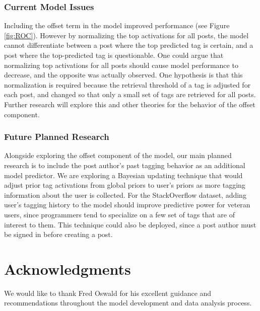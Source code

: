 \documentclass[10pt,letterpaper]{article}
\begin{document}
\subsubsection{Current Model Issues}

Including the offset term in the model improved performance (see Figure \ref{fig:ROC}).
However by normalizing the top activations for all posts, the model cannot differentiate between a post where the top predicted tag is certain, and a post where the top-predicted tag is questionable.
One could argue that normalizing top activations for all posts should cause model performance to decrease, and the opposite was actually observed.
One hypothesis is that this normalization is required because the retrieval threshold of a tag is adjusted for each post, and changed so that only a small set of tags are retrieved for all posts.
Further research will explore this and other theories for the behavior of the offset component.

\subsubsection{Future Planned Research}

Alongside exploring the offset component of the model, our main planned research is to include the post author's past tagging behavior as an additional model predictor.
We are exploring a Bayesian updating technique that would adjust prior tag activations from global priors to user's priors as more tagging information about the user is collected.
For the StackOverflow dataset, adding user's tagging history to the model should improve predictive power for veteran users,
since programmers tend to specialize on a few set of tags that are of interest to them.
This technique could also be deployed, since a post author must be signed in before creating a post.

\section{Acknowledgments}

We would like to thank Fred Oswald for his excellent guidance and recommendations throughout the model development and data analysis process.


\setlength{\bibleftmargin}{.125in}
\setlength{\bibindent}{-\bibleftmargin}

\end{document}
